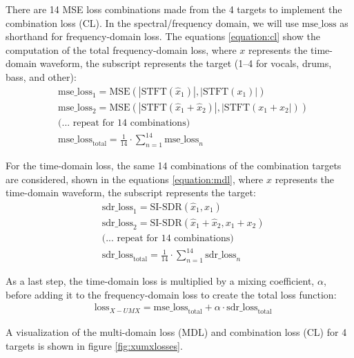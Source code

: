 \documentclass[report.tex]{subfiles}
\begin{document}
There are 14 MSE loss combinations made from the 4 targets to implement the combination loss (CL). In the spectral/frequency domain, we will use $\text{mse\_loss}$ as shorthand for frequency-domain loss. The equations \ref{equation:cl} show the computation of the total frequency-domain loss, where $x$ represents the time-domain waveform, the subscript represents the target (1--4 for vocals, drums, bass, and other):
\begin{align}\tag{5}\label{equation:cl}
	\nonumber & \text{mse\_loss}_{1} = \text{MSE}(|\text{STFT}(\hat{x}_{1})|, |\text{STFT}(x_{1})|)\\
	\nonumber & \text{mse\_loss}_{2} = \text{MSE}(|\text{STFT}(\hat{x}_{1} + \hat{x}_{2})|, |\text{STFT}(x_{1} + x_{2}|))\\
	\nonumber & \text{(... repeat for 14 combinations)}\\
	\nonumber & \text{mse\_loss}_{\text{total}} = \frac{1}{14} \cdot \sum_{n = 1}^{14}{\text{mse\_loss}_{n}}
\end{align}

For the time-domain loss, the same 14 combinations of the combination targets are considered, shown in the equations \ref{equation:mdl}, where $x$ represents the time-domain waveform, the subscript represents the target:
\begin{align}\tag{6}\label{equation:mdl}
	\nonumber & \text{sdr\_loss}_{1} = \text{SI-SDR}(\hat{x}_{1}, x_{1})\\
	\nonumber & \text{sdr\_loss}_{2} = \text{SI-SDR}(\hat{x}_{1} + \hat{x}_{2}, x_{1} + x_{2})\\
	\nonumber & \text{(... repeat for 14 combinations)}\\
	\nonumber & \text{sdr\_loss}_{\text{total}} = \frac{1}{14} \cdot \sum_{n = 1}^{14}{\text{sdr\_loss}_{n}}
\end{align}

As a last step, the time-domain loss is multiplied by a mixing coefficient, $\alpha$, before adding it to the frequency-domain loss to create the total loss function:
\begin{align}
	\nonumber & \text{loss}_{X-UMX} = \text{mse\_loss}_{\text{total}} + \alpha \cdot \text{sdr\_loss}_{\text{total}}
\end{align}

 A visualization of the multi-domain loss (MDL) and combination loss (CL) for 4 targets is shown in figure \ref{fig:xumxlosses}.
\end{document}
